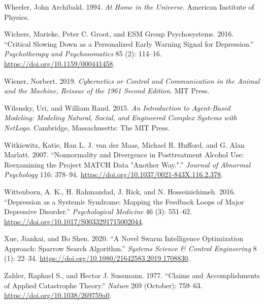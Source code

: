 \documentclass[
  letterpaper,
]{scrbook}
\newlength{\cslhangindent}
\newlength{\cslentryspacingunit} %
\newenvironment{CSLReferences}[2] %
 {%
  \setlength{\parindent}{0pt}
  \ifodd #1
  \let\oldpar\par
  \def\par{\hangindent=\cslhangindent\oldpar}
  \fi
  \setlength{\parskip}{#2\cslentryspacingunit}
 }%
 {}
\begin{document}
\begin{CSLReferences}{1}{0}
\leavevmode{}%
Wheeler, John Archibald. 1994. \emph{At {Home} in the {Universe}}.
{American Institute of Physics}.

\leavevmode{}%
Wichers, Marieke, Peter C. Groot, and ESM Group Psychosystems. 2016.
{``Critical {Slowing Down} as a {Personalized Early Warning Signal} for
{Depression}.''} \emph{Psychotherapy and Psychosomatics} 85 (2):
114--16. \url{https://doi.org/10.1159/000441458}.

\leavevmode{}%
Wiener, Norbert. 2019. \emph{Cybernetics or {Control} and
{Communication} in the {Animal} and the {Machine}, {Reissue} of the 1961
Second Edition}. {MIT Press}.

\leavevmode{}%
Wilensky, Uri, and William Rand. 2015. \emph{An Introduction to
Agent-Based Modeling: Modeling Natural, Social, and Engineered Complex
Systems with {NetLogo}}. {Cambridge, Massachusetts}: {The MIT Press}.

\leavevmode{}%
Witkiewitz, Katie, Han L. J. van der Maas, Michael R. Hufford, and G.
Alan Marlatt. 2007. {``Nonnormality and Divergence in Posttreatment
Alcohol Use: {Reexamining} the {Project MATCH} Data "Another Way.".''}
\emph{Journal of Abnormal Psychology} 116: 378--94.
\url{https://doi.org/10.1037/0021-843X.116.2.378}.

\leavevmode{}%
Wittenborn, A. K., H. Rahmandad, J. Rick, and N. Hosseinichimeh. 2016.
{``Depression as a Systemic Syndrome: Mapping the Feedback Loops of
Major Depressive Disorder.''} \emph{Psychological Medicine} 46 (3):
551--62. \url{https://doi.org/10.1017/S0033291715002044}.

\leavevmode{}%
Xue, Jiankai, and Bo Shen. 2020. {``A Novel Swarm Intelligence
Optimization Approach: Sparrow Search Algorithm.''} \emph{Systems
Science \& Control Engineering} 8 (1): 22--34.
\url{https://doi.org/10.1080/21642583.2019.1708830}.

\leavevmode{}%
Zahler, Raphael S., and Hector J. Sussmann. 1977. {``Claims and
Accomplishments of Applied Catastrophe Theory.''} \emph{Nature} 269
(October): 759--63. \url{https://doi.org/10.1038/269759a0}.


\end{CSLReferences}
\end{document}
